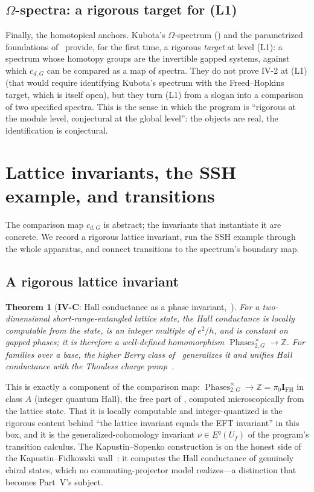 \documentclass[12pt]{article}
\newcommand{\Phases}{\operatorname{Phases}}    %
\newcommand{\IFH}{\mathbf{I}_{\mathrm{FH}}}  %
\newcommand{\Zp}{\mathbb{Z}}
\newtheorem{theorem}{Theorem}[section]
\theoremstyle{definition}
\theoremstyle{remark}
\theoremstyle{plain}
\begin{document}
\subsection{\texorpdfstring{$\Omega$}{Omega}-spectra: a rigorous target for (L1)}

Finally, the homotopical anchors. Kubota's $\Omega$-spectrum
() and the parametrized foundations of~\cite{beaudry-etal}
provide, for the first time, a rigorous \emph{target} at level (L1): a spectrum
whose homotopy groups are the invertible gapped systems, against which
$c_{d,G}$ can be compared as a map of spectra. They do not prove IV-2 at (L1)
(that would require identifying Kubota's spectrum with the Freed--Hopkins
target, which is itself open), but they turn (L1) from a slogan into a comparison
of two specified spectra. This is the sense in which the program is ``rigorous at
the module level, conjectural at the global level'': the objects are real, the
identification is conjectural.

\section{Lattice invariants, the SSH example, and transitions}
\label{sec:invariants}

The comparison map $c_{d,G}$ is abstract; the invariants that instantiate it are
concrete. We record a rigorous lattice invariant, run the SSH example through the
whole apparatus, and connect transitions to the spectrum's boundary map.

\subsection{A rigorous lattice invariant}

\begin{theorem}[\textbf{IV-C}: Hall conductance as a phase invariant,~\cite{kapustin-sopenko-hall,kapustin-sopenko-noether}]
\label{thm:hall}
For a two-dimensional short-range-entangled lattice state, the Hall conductance
is locally computable from the state, is an integer multiple of $e^2/h$, and is
constant on gapped phases; it is therefore a well-defined homomorphism
$\Phases_{2,G}^{\times}\to\Zp$. For families over a base, the higher Berry class
of~\cite{kapustin-sopenko-noether} generalizes it and unifies Hall conductance
with the Thouless charge pump~\cite{thouless-pump}.
\end{theorem}

This is exactly a component of the comparison map: $\Phases_{2,G}^{\times}\to\Zp
=\pi_0\IFH$ in class $A$ (integer quantum Hall), the free part of
, computed microscopically from the lattice state. That it is
locally computable and integer-quantized is the rigorous content behind ``the
lattice invariant equals the EFT invariant'' in this box, and it is the
generalized-cohomology invariant $\nu\in E^q(U_f)$ of the program's transition
calculus. The Kapustin--Sopenko construction is on the honest side of the
Kapustin--Fidkowski wall~\cite{kapustin-fidkowski}: it computes the Hall
conductance of genuinely chiral states, which no commuting-projector model
realizes---a distinction that becomes Part~V's subject.
\end{document}
